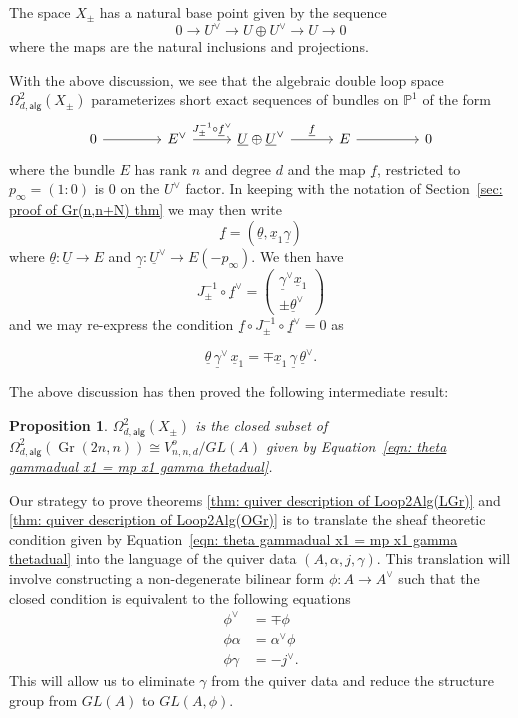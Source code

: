 \documentclass{amsart}
\newtheorem{proposition}[theorem]{Proposition}
\theoremstyle{definition}
\newcommand{\PP}{\mathbb{P}}
\newcommand{\UL}[1]{\underline{#1}}
\newcommand{\alg}{\mathsf{alg}}
\newcommand{\Gr}{\operatorname{Gr}}
\newcommand{\LoopTwo}{\Omega^{2}_{d,\alg}}
\newcommand{\Xpm}{X_{\pm}}
\begin{document}
The space $\Xpm$ has a natural base point given by the sequence
\[
0\to U^{\vee}\to U\oplus U^{\vee} \to U\to 0
\]
where the maps are the natural inclusions and projections.

With the above discussion, we see that the algebraic double loop space
$\LoopTwo(\Xpm )$ parameterizes short exact sequences of
bundles on $\PP^{1}$ of the form
\begin{equation}\label{eqn: Evee-->U+Uvee-->E}
\begin{tikzcd}[column sep={6em,between origins}]
0 \arrow[r] &
E^{\vee } \arrow[r, "J_{\pm }^{-1}\circ \UL{f}^{\vee}"] &
\UL{U}\oplus \UL{U}^{\vee } \arrow[r, "\UL{f}"] &
E \arrow[r] &
0
\end{tikzcd}
\end{equation}
where the bundle $E$ has rank $n$ and degree $d$ and the map $\UL{f}$,
restricted to $p_{\infty} = (1:0)$ is 0 on the $U^{\vee}$ factor. In
keeping with the notation of Section~\ref{sec: proof of Gr(n,n+N) thm}
we may then write
\[
\UL{f} = (\UL{\theta},\UL{x}_{1}\UL{\gamma})
\]
where $\UL{\theta}:\UL{U}\to E$ and $\UL{\gamma}:\UL{U}^{\vee}\to
E(-p_{\infty}).$ We then have
\[
J_{\pm}^{-1}\circ \UL{f}^{\vee} = \begin{pmatrix} \UL{\gamma}^{\vee}\UL{x}_{1} \\
\pm \UL{\theta}^{\vee}  \end{pmatrix}
\]
and we may re-express the condition $\UL{f}\circ J_{\pm}^{-1}\circ
\UL{f}^{\vee}=0$ as

\begin{equation}\label{eqn: theta gammadual x1 = mp x1 gamma thetadual}
\UL{\theta}\, \UL{\gamma}^{\vee}\, \UL{x}_{1} =  \mp \UL{x}_{1}\, 
\UL{\gamma}\,  \UL{\theta}^{\vee }.
\end{equation}

The above discussion has then proved the following intermediate result:

\begin{proposition}\label{prop: Loop2(Xpm) is a closed set in
Loop(Gr(n,2n)) satisfying condition involving theta and gamma}
$\LoopTwo (\Xpm )$ is the closed subset of $\LoopTwo (\Gr(2n,n))\cong
V^{o}_{n,n,d}/GL(A)$ given by Equation~\eqref{eqn: theta gammadual x1
= mp x1 gamma thetadual}. 
\end{proposition}

Our strategy to prove theorems \ref{thm: quiver description of
Loop2Alg(LGr)} and \ref{thm: quiver description of Loop2Alg(OGr)} is
to translate the sheaf theoretic condition given by
Equation~\eqref{eqn: theta gammadual x1 = mp x1 gamma thetadual} into
the language of the quiver data $(A,\alpha ,j,\gamma )$. This
translation will involve constructing a non-degenerate bilinear form
$\phi :A\to A^{\vee}$ such that the closed condition is equivalent to
the following equations
\begin{align}\label{eqns: closed conditions}
\phi^{\vee}&= \mp \phi \nonumber \\ 
\phi \alpha &=\alpha^{\vee}\phi \\
\phi \gamma &= - j^{\vee}. \nonumber 
\end{align}
This will allow us to eliminate $\gamma$ from the quiver data and
reduce the structure group from $GL(A)$ to $GL(A,\phi )$.
\end{document}
